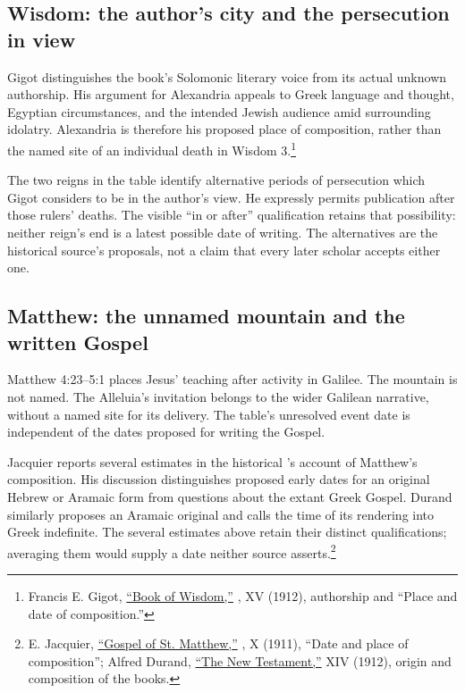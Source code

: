 \subsection{Wisdom: the author's city and the persecution in view}
\label{hist-wisdom}
Gigot distinguishes the book's Solomonic literary voice from its
actual unknown authorship. His argument for Alexandria appeals to
Greek language and thought, Egyptian circumstances, and the intended
Jewish audience amid surrounding idolatry. Alexandria is therefore
his proposed place of composition, rather than the named site of an
individual death in Wisdom 3.\footnote{Francis E. Gigot,
\href{https://www.newadvent.org/cathen/15666a.htm}{``Book of Wisdom,''}
, XV (1912), authorship and ``Place and
date of composition.''}

The two reigns in the table identify alternative periods of persecution
which Gigot considers to be in the author's view. He expressly permits
publication after those rulers' deaths. The visible ``in or after''
qualification retains that possibility: neither reign's end is a
latest possible date of writing. The alternatives are the historical
source's proposals, not a claim that every later scholar accepts
either one.

\subsection{Matthew: the unnamed mountain and the written Gospel}
\label{hist-matthew}
Matthew 4:23--5:1 places Jesus' teaching after activity in Galilee.
The mountain is not named. The Alleluia's invitation belongs to the
wider Galilean narrative, without a named site for its delivery.
The table's unresolved event date is independent of the dates proposed
for writing the Gospel.

Jacquier reports several estimates in the historical 's account of Matthew's composition. His discussion
distinguishes proposed early dates for an original Hebrew or Aramaic
form from questions about the extant Greek Gospel. Durand similarly
proposes an Aramaic original and calls the time of its rendering into
Greek indefinite. The several estimates above retain their distinct
qualifications; averaging them would supply a date neither source
asserts.\footnote{E. Jacquier,
\href{https://www.newadvent.org/cathen/10057a.htm}{``Gospel of St.
Matthew,''} , X (1911), ``Date and place
of composition''; Alfred Durand,
\href{https://www.newadvent.org/cathen/14530a.htm}{``The New Testament,''}
XIV (1912), origin and composition of the books.}

